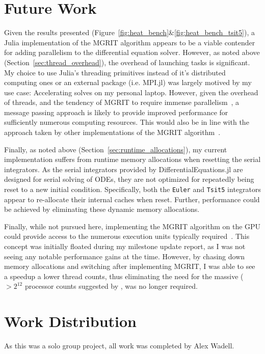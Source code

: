 \documentclass{article}
\begin{document}
\section{Future Work}

Given the results presented (Figure~\ref{fig:heat_bench}&\ref{fig:heat_bench_tsit5}), a Julia implementation of the MGRIT algorithm appears to be a viable contender for adding parallelism to the differential equation solver.
However, as noted above (Section~\ref{sec:thread_overhead}), the overhead of launching tasks is significant.
My choice to use Julia's threading primitives instead of it's distributed computing ones or an external package (i.e. MPI.jl) was largely motived by my use case: Accelerating solves on my personal laptop.
However, given the overhead of threads, and the tendency of MGRIT to require immense parallelism~\cite{friedhoffMULTIGRIDINTIMEALGORITHMSOLVING}, a message passing approach is likely to provide improved performance for sufficiently numerous computing resources.
This would also be in line with the approach taken by other implementations of the MGRIT algorithm~\cite{xbraid-package, hahnePyMGRITPythonPackage2020}.

Finally, as noted above (Section~\ref{sec:runtime_allocations}), my current implementation suffers from runtime memory allocations when resetting the serial integrators.
As the serial integrators provided by DifferentialEquations.jl are designed for serial solving of ODEs, they are not optimized for repeatedly being reset to a new initial condition.
Specifically, both the \verb!Euler! and \verb!Tsit5! integrators appear to re-allocate their internal caches when reset.
Further, performance could be achieved by eliminating these dynamic memory allocations.

Finally, while not pursued here, implementing the MGRIT algorithm on the GPU could provide access to the numerous execution units typically required~\cite{friedhoffMULTIGRIDINTIMEALGORITHMSOLVING}.
This concept was initially floated during my milestone update report, as I was not seeing any notable performance gains at the time.
However, by chasing down memory allocations and switching after implementing MGRIT, I was able to see a speedup a lower thread counts, thus eliminating the need for the massive (\(>2^{12}\) processor counts suggested by \citeauthor{friedhoffMULTIGRIDINTIMEALGORITHMSOLVING}, was no longer required.

\section{Work Distribution}

As this was a solo group project, all work was completed by Alex Wadell.

\clearpage
\printbibliography
\end{document}

